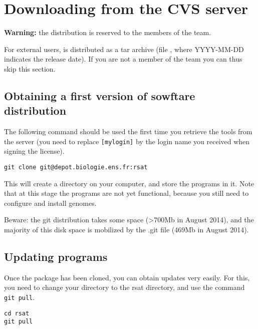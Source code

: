 \section{Downloading \RSAT from the CVS server}

\textbf{Warning:} the  distribution is reserved to the
members of the \RSAT team. 

For external users, \RSAT is distributed as a tar archive (file
, where YYYY-MM-DD indicates the
release date). If you are not a member of the \RSAT team you can thus
skip this section.

\subsection{Obtaining a first version of \RSAT sowftare distribution}

The following command should be used the first time you retrieve the
tools from the server (you need to replace \texttt{[mylogin]} by the
login name you received when signing the \RSAT license).

\begin{lstlisting}
git clone git@depot.biologie.ens.fr:rsat
\end{lstlisting}

This will create a directory  on your computer, and store
the programs in it. Note that at this stage the programs are not yet
functional, because you still need to configure \RSAT and install
genomes.

Beware: the git distribution takes some space (>700Mb in August 2014),
and the majority of this disk space is mobilized by the .git file
(469Mb in August 2014). 

\subsection{Updating \RSAT programs}

Once the package has been cloned, you can obtain updates very
easily. For this, you need to change your directory to the rsat
directory, and use the command \texttt{git pull}.

\begin{lstlisting}
cd rsat
git pull
\end{lstlisting}


